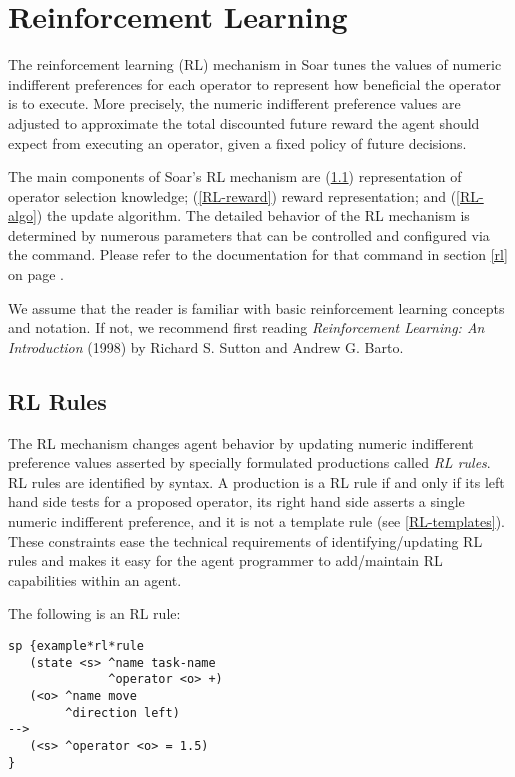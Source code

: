 \chapter{Reinforcement Learning}
\label{RL}

The reinforcement learning (RL) mechanism in Soar tunes the values of numeric indifferent preferences for each operator to represent how beneficial the operator is to execute.
More precisely, the numeric indifferent preference values are adjusted to approximate the total discounted future reward the agent should expect from executing an operator, given a fixed policy of future decisions.

The main components of Soar's RL mechanism are (\ref{RL-rules}) representation of operator selection knowledge; (\ref{RL-reward}) reward representation; and (\ref{RL-algo}) the update algorithm. 
The detailed behavior of the RL mechanism is determined by numerous parameters that can be controlled and configured via the  command. Please refer to the documentation for that command in section \ref{rl} on page \pageref{rl}.

We assume that the reader is familiar with basic reinforcement learning concepts and notation. If not, we recommend first reading \emph{Reinforcement Learning: An Introduction} (1998) by Richard S. Sutton and Andrew G. Barto.

\section{RL Rules}
\label{RL-rules}

The RL mechanism changes agent behavior by updating numeric indifferent preference values asserted by specially formulated productions called \emph{RL rules}.
RL rules are identified by syntax.
A production is a RL rule if and only if its left hand side tests for a proposed operator, its right hand side asserts a single numeric indifferent preference, and it is not a template rule (see \ref{RL-templates}).
These constraints ease the technical requirements of identifying/updating RL rules and makes it easy for the agent programmer to add/maintain RL capabilities within an agent.

The following is an RL rule:

\begin{verbatim}
sp {example*rl*rule
   (state <s> ^name task-name
	          ^operator <o> +)
   (<o> ^name move
	    ^direction left)
-->
   (<s> ^operator <o> = 1.5)
}
\end{verbatim}

